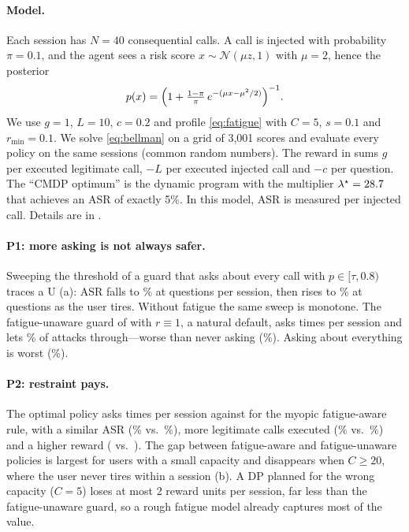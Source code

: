 \documentclass[10pt]{article}
\theoremstyle{plain}
\theoremstyle{definition}
\begin{document}
\paragraph{Model.} Each session has $N=40$ consequential calls. A call is injected with probability $\pi=0.1$, and the agent sees a risk score $x\sim\mathcal N(\mu z,1)$ with $\mu=2$, hence the posterior
\[
p(x)=\Bigl(1+\tfrac{1-\pi}{\pi}\,e^{-(\mu x-\mu^2/2)}\Bigr)^{-1}.
\]
We use $g=1$, $L=10$, $c=0.2$ and profile \eqref{eq:fatigue} with $C=5$, $s=0.1$ and $r_{\min}=0.1$. We solve \eqref{eq:bellman} on a grid of 3{,}001 scores and evaluate every policy on the same \SimNsessions{} sessions (common random numbers). The reward in  sums $g$ per executed legitimate call, $-L$ per executed injected call and $-c$ per question. The ``CMDP optimum'' is the dynamic program with the multiplier $\lambda^\star=28.7$ that achieves an ASR of exactly 5\%. In this model, ASR is measured per injected call. Details are in .

\begin{table}[t]
\centering
\small
\caption{\textbf{Stylized simulation} (\SimNsessions{} sessions of 40 calls; standard errors of the reward are at most 0.13). ASR: share of injected calls executed. Benign done: share of legitimate calls executed. The last block trains 's toy analogue with a 5\% budget; its learned policies are stochastic.}
\label{tab:sim}

\end{table}

\paragraph{P1: more asking is not always safer.} Sweeping the threshold of a guard that asks about every call with $p\in[\tau,0.8)$ traces a U (a): ASR falls to \SimSweepMinASR\% at \SimSweepMinAsks{} questions per session, then rises to \SimSweepMaxAsksASR\% at \SimSweepMaxAsks{} questions as the user tires. Without fatigue the same sweep is monotone. The fatigue-unaware guard of  with $r\equiv1$, a natural default, asks \SimStaticAsks{} times per session and lets \SimStaticASR\% of attacks through---worse than never asking (\SimAutoASR\%). Asking about everything is worst (\SimAlwaysASR\%).

\paragraph{P2: restraint pays.} The optimal policy asks \SimDPAsks{} times per session against \SimMyopicAsks{} for the myopic fatigue-aware rule, with a similar ASR (\SimDPASR\% vs.\ \SimMyopicASR\%), more legitimate calls executed (\SimDPBenign\% vs.\ \SimMyopicBenign\%) and a higher reward (\SimDPReward{} vs.\ \SimMyopicReward). The gap between fatigue-aware and fatigue-unaware policies is largest for users with a small capacity and disappears when $C\ge20$, where the user never tires within a session (b). A DP planned for the wrong capacity ($C=5$) loses at most 2 reward units per session, far less than the fatigue-unaware guard, so a rough fatigue model already captures most of the value.
\end{document}
